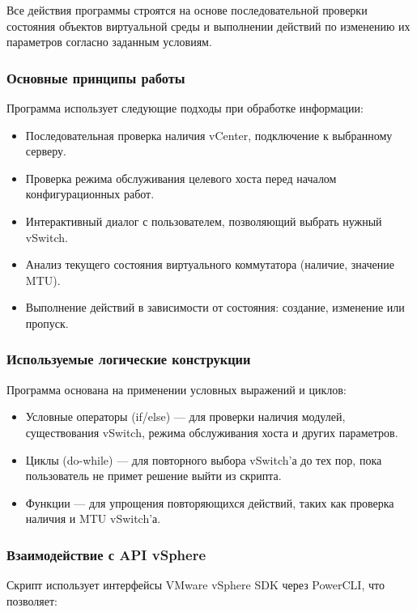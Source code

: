 Все действия программы строятся на основе последовательной проверки состояния объектов виртуальной среды и выполнении действий по изменению их параметров согласно заданным условиям.

\subsubsection{Основные принципы работы}
Программа использует следующие подходы при обработке информации:

\begin{itemize}
    \item Последовательная проверка наличия vCenter, подключение к выбранному серверу.
    \item Проверка режима обслуживания целевого хоста перед началом конфигурационных работ.
    \item Интерактивный диалог с пользователем, позволяющий выбрать нужный vSwitch.
    \item Анализ текущего состояния виртуального коммутатора (наличие, значение MTU).
    \item Выполнение действий в зависимости от состояния: создание, изменение или пропуск.
\end{itemize}

\subsubsection{Используемые логические конструкции}
Программа основана на применении условных выражений и циклов:

\begin{itemize}
    \item Условные операторы (if/else) — для проверки наличия модулей, существования vSwitch, режима обслуживания хоста и других параметров.
    \item Циклы (do-while) — для повторного выбора vSwitch'а до тех пор, пока пользователь не примет решение выйти из скрипта.
    \item Функции — для упрощения повторяющихся действий, таких как проверка наличия и MTU vSwitch'а.
\end{itemize}

\subsubsection{Взаимодействие с API vSphere}
Скрипт использует интерфейсы VMware vSphere SDK через PowerCLI, что позволяет:

